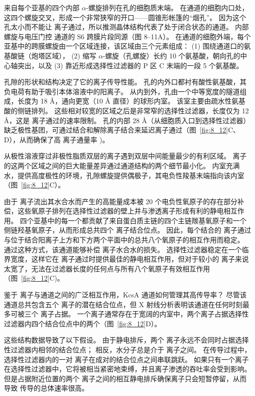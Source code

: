来自每个亚基的四个内部 $\alpha$-螺旋排列在孔的细胞质末端。
在通道的细胞内口处，这四个螺旋交叉，形成一个非常狭窄的开口——圆锥形帐篷的“烟孔”。
因为这个孔太小而不能让  离子通过，所以推测晶体结构代表了处于闭合状态的通道。
内部螺旋与电压门控  通道的 S6 跨膜片段同源（图 8–11A）。
在通道的细胞外端，每个亚基中的跨膜螺旋由一个区域连接，该区域由三个元素组成：
(1) 围绕通道口的氨基酸链（炮塔区域），
(2) 缩写 $\alpha$-螺旋（孔螺旋）长约 10 个氨基酸，朝向孔的中心轴突出，以及
(3) 靠近形成选择性过滤器的 P 区 C 末端的一段 5 个氨基酸。


孔隙的形状和结构决定了它的离子传导性能。
孔的内外口都衬有酸性氨基酸，其负电荷有助于吸引本体溶液中的阳离子。
从内到外，孔由一个中等宽度的隧道组成，长度为 18 Å，通向更宽（10 Å 直径）的球形内室。
该室主要由疏水性氨基酸的侧链排列。
这些相对较宽的区域之后是非常窄的选择性过滤器，长度仅为 12 Å，这是  离子通过的速率限制。
孔的内部 28 Å（从细胞质入口到选择性过滤器）缺乏极性基团，可通过结合和解除离子结合来延迟离子通过（图~\ref{fig:8_12}C、D），从而确保了高  离子通量率 )。


从极性溶液穿过非极性脂质双层的离子遇到双层中间能量最少的有利区域。
 离子的这两个区域之间的巨大能量差异通过通道结构的两个细节最小化。
内室充满水，提供高度极性的环境，孔隙螺旋提供偶极子，其电负性羧基末端指向该内室（图~\ref{fig:8_12}C）。


由于  离子流出其水合水而产生的高能量成本被 20 个电负性氧原子的存在部分补偿，这些氧原子排列在选择性过滤器的壁上并与渗透离子形成有利的静电相互作用。 
四个亚基中的每一个都贡献了来自蛋白质主链的四个主链羰基氧原子和一个侧链羟基氧原子，从而形成总共四个  离子结合位点。
因此，每个结合的  离子通过与位于结合阳离子上方和下方两个平面中的总共八个氧原子的相互作用而稳定。 
通过这种方式，该通道能够补偿  离子水合水的损失。
选择性过滤器稳定在一个临界宽度，这样它在  离子通过时提供最佳的静电相互作用，但对于较小的  离子来说太宽了，无法在过滤器长度的任何点与所有八个氧原子有效相互作用（图~\ref{fig:8_12}C)。


鉴于  离子与通道之间的广泛相互作用，KcsA 通道如何管理其高传导率？
尽管该通道总共包含五个  离子的潜在结合位点，但 X 射线分析表明该通道在任何时刻最多可被三个  离子占据。
一个离子通常存在于宽阔的内室中，两个离子占据选择性过滤器内四个结合位点中的两个（图~\ref{fig:8_12}D）。


这些结构数据导致了以下假设。
由于静电排斥，两个  离子永远不会同时占据选择性过滤器内相邻的结合位点；
相反，水分子总是介于  离子之间。
在传导过程中，选择性过滤器内的一对  离子在成对的结合位点之间串联跳跃。
如果只有一个离子在选择性过滤器中，它将被相当紧密地束缚，并且离子渗透的吞吐率会受到影响。
但是占据附近位置的两个  离子之间的相互静电排斥确保离子只会短暂停留，从而导致  传导的总体速率很高。


